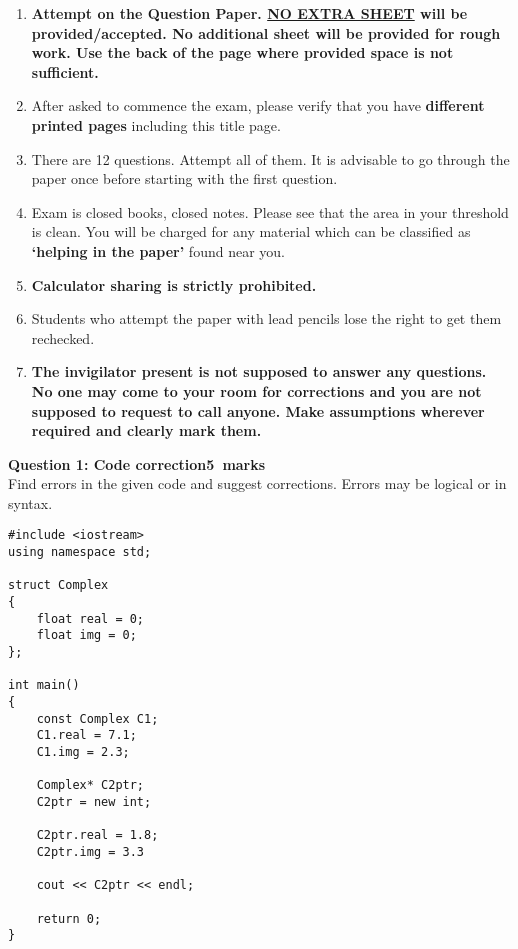 \documentclass[12pt,a4paper]{article}
\def\QOne{5}
\begin{document}
\begin{enumerate}
\item \textbf{Attempt on the Question Paper. \underline{NO EXTRA SHEET} will be provided/accepted. No
additional sheet will be provided for rough work. Use the back of the page where
provided space is not sufficient.}
\item After asked to commence the exam, please verify that you have \textbf{\pageref{LastPage} different
printed pages} including this title page.
\item There are 12 questions. Attempt all of them. It is advisable to go through the paper once
before starting with the first question.
\item Exam is closed books, closed notes. Please see that the area in your threshold is clean.
You will be charged for any material which can be classified as \textbf{`helping in the paper'}
found near you.
\item \textbf{Calculator sharing is strictly prohibited.}
\item Students who attempt the paper with lead pencils lose the right to get them rechecked.
\item \textbf{The invigilator present is not supposed to answer any questions. No one may come
to your room for corrections and you are not supposed to request to call anyone.
Make assumptions wherever required and clearly mark them.}
\end{enumerate}
\newpage
\noindent\textbf{Question 1: Code correction\hfill \QOne~marks}\\
Find errors in the given code and suggest corrections. Errors may be logical or in syntax.
\begin{lstlisting}
#include <iostream>
using namespace std;

struct Complex
{
	float real = 0;
	float img = 0;
};

int main()
{
	const Complex C1;
	C1.real = 7.1;
	C1.img = 2.3;

	Complex* C2ptr;
	C2ptr = new int;
	
	C2ptr.real = 1.8;
	C2ptr.img = 3.3
	
	cout << C2ptr << endl;

	return 0;
}
\end{lstlisting}
\begin{figure}[H]
\end{figure}
\end{document}
